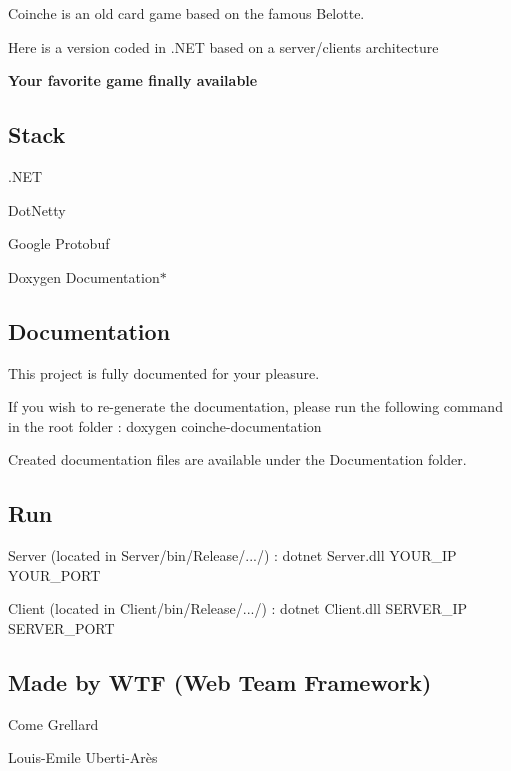 Coinche is an old card game based on the famous Belotte.

Here is a version coded in .N\+ET based on a server/clients architecture

{\bfseries Your favorite game finally available}

\subsection*{Stack}


\begin{DoxyItemize}
\item .N\+ET
\item Dot\+Netty
\item Google Protobuf
\item Doxygen Documentation$\ast$
\end{DoxyItemize}

\subsection*{Documentation}

This project is fully documented for your pleasure.

If you wish to re-\/generate the documentation, please run the following command in the root folder \+: {\ttfamily doxygen coinche-\/documentation}

Created documentation files are available under the Documentation folder.

\subsection*{Run}

Server (located in Server/bin/\+Release/.../) \+: {\ttfamily dotnet Server.\+dll Y\+O\+U\+R\+\_\+\+IP Y\+O\+U\+R\+\_\+\+P\+O\+RT}

Client (located in Client/bin/\+Release/.../) \+: {\ttfamily dotnet Client.\+dll S\+E\+R\+V\+E\+R\+\_\+\+IP S\+E\+R\+V\+E\+R\+\_\+\+P\+O\+RT} 



\subsection*{Made by W\+TF (Web Team Framework)}


\begin{DoxyItemize}
\item Come Grellard
\item Louis-\/\+Emile Uberti-\/\+Arès 
\end{DoxyItemize}